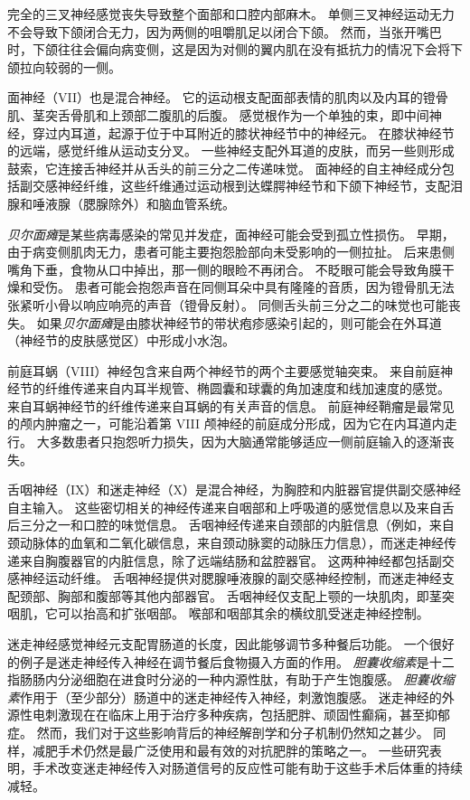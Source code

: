 完全的三叉神经感觉丧失导致整个面部和口腔内部麻木。
单侧三叉神经运动无力不会导致下颌闭合无力，因为两侧的咀嚼肌足以闭合下颌。
然而，当张开嘴巴时，下颌往往会偏向病变侧，这是因为对侧的翼内肌在没有抵抗力的情况下会将下颌拉向较弱的一侧。


面神经（VII）也是混合神经。
它的运动根支配面部表情的肌肉以及内耳的镫骨肌、茎突舌骨肌和上颈部二腹肌的后腹。
感觉根作为一个单独的束，即中间神经，穿过内耳道，起源于位于中耳附近的膝状神经节中的神经元。
在膝状神经节的远端，感觉纤维从运动支分叉。
一些神经支配外耳道的皮肤，而另一些则形成鼓索，它连接舌神经并从舌头的前三分之二传递味觉。
面神经的自主神经成分包括副交感神经纤维，这些纤维通过运动根到达蝶腭神经节和下颌下神经节，支配泪腺和唾液腺（腮腺除外）和脑血管系统。


\textit{贝尔面瘫}是某些病毒感染的常见并发症，面神经可能会受到孤立性损伤。
早期，由于病变侧肌肉无力，患者可能主要抱怨脸部向未受影响的一侧拉扯。
后来患侧嘴角下垂，食物从口中掉出，那一侧的眼睑不再闭合。
不眨眼可能会导致角膜干燥和受伤。
患者可能会抱怨声音在同侧耳朵中具有隆隆的音质，因为镫骨肌无法张紧听小骨以响应响亮的声音（镫骨反射）。
同侧舌头前三分之二的味觉也可能丧失。
如果\textit{贝尔面瘫}是由膝状神经节的带状疱疹感染引起的，则可能会在外耳道（神经节的皮肤感觉区）中形成小水泡。


前庭耳蜗（VIII）神经包含来自两个神经节的两个主要感觉轴突束。
来自前庭神经节的纤维传递来自内耳半规管、椭圆囊和球囊的角加速度和线加速度的感觉。
来自耳蜗神经节的纤维传递来自耳蜗的有关声音的信息。
前庭神经鞘瘤是最常见的颅内肿瘤之一，可能沿着第 VIII 颅神经的前庭成分形成，因为它在内耳道内走行。
大多数患者只抱怨听力损失，因为大脑通常能够适应一侧前庭输入的逐渐丧失。


舌咽神经（IX）和迷走神经（X）是混合神经，为胸腔和内脏器官提供副交感神经自主输入。
这些密切相关的神经传递来自咽部和上呼吸道的感觉信息以及来自舌后三分之一和口腔的味觉信息。
舌咽神经传递来自颈部的内脏信息（例如，来自颈动脉体的血氧和二氧化碳信息，来自颈动脉窦的动脉压力信息），而迷走神经传递来自胸腹器官的内脏信息，除了远端结肠和盆腔器官。
这两种神经都包括副交感神经运动纤维。
舌咽神经提供对腮腺唾液腺的副交感神经控制，而迷走神经支配颈部、胸部和腹部等其他内部器官。
舌咽神经仅支配上颚的一块肌肉，即茎突咽肌，它可以抬高和扩张咽部。
喉部和咽部其余的横纹肌受迷走神经控制。


迷走神经感觉神经元支配胃肠道的长度，因此能够调节多种餐后功能。
一个很好的例子是迷走神经传入神经在调节餐后食物摄入方面的作用。
\textit{胆囊收缩素}是十二指肠肠内分泌细胞在进食时分泌的一种内源性肽，有助于产生饱腹感。
\textit{胆囊收缩素}作用于（至少部分）肠道中的迷走神经传入神经，刺激饱腹感。
迷走神经的外源性电刺激现在在临床上用于治疗多种疾病，包括肥胖、顽固性癫痫，甚至抑郁症。
然而，我们对于这些影响背后的神经解剖学和分子机制仍然知之甚少。
同样，减肥手术仍然是最广泛使用和最有效的对抗肥胖的策略之一。
一些研究表明，手术改变迷走神经传入对肠道信号的反应性可能有助于这些手术后体重的持续减轻。


